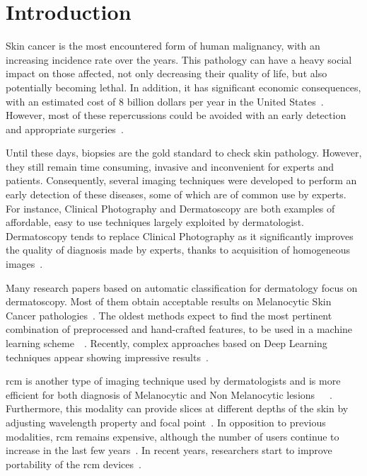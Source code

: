 \section{Introduction}
\label{intro}
Skin cancer is the most encountered form of human malignancy, with an increasing incidence rate over the years. This pathology can have a heavy social impact on those affected, not only decreasing their quality of life, but also potentially becoming lethal. In addition, it has significant economic consequences, with an estimated cost of 8 billion dollars per year in the United States~\cite{Farberg2017a}. However, most of these repercussions could be avoided with an early detection and appropriate surgeries~\cite{Farberg2017a}.\par
Until these days, biopsies are the gold standard to check skin pathology. However, they still remain time consuming, invasive and inconvenient for experts and patients. Consequently, several imaging techniques were developed to perform an early detection of these diseases, some of which are of common use by experts. For instance, Clinical Photography and Dermatoscopy are both examples of affordable, easy to use techniques largely exploited by dermatologist. Dermatoscopy tends to replace Clinical Photography as it significantly improves the quality of diagnosis made by experts, thanks to acquisition of homogeneous images~\cite{Sinz2017}.\par
Many research papers based on automatic classification for dermatology focus on dermatoscopy. Most of them obtain acceptable results on Melanocytic Skin Cancer pathologies~\cite{Iyatomi2010}. The oldest methods expect to find the most pertinent combination of preprocessed and hand-crafted features, to be used in a machine learning scheme~\cite{Rastgoo2015}~\cite{Pathan2018}. Recently, complex approaches based on Deep Learning techniques appear showing impressive results~\cite{Esteva2017}.\par
\ac{rcm} is another type of imaging technique used by dermatologists and is more efficient for both diagnosis of Melanocytic and Non Melanocytic lesions~\cite{Gerger2006}~\cite{Guitera2009}~\cite{Haroon2017}. Furthermore, this modality can provide slices at different depths of the skin by adjusting wavelength property and focal point~\cite{Kolm2012}. In opposition to previous modalities, \ac{rcm} remains expensive, although the number of users continue to increase in the last few years~\cite{Batta2015}. In recent years, researchers start to improve portability of the \ac{rcm} devices~\cite{Freeman2018}.\par 
